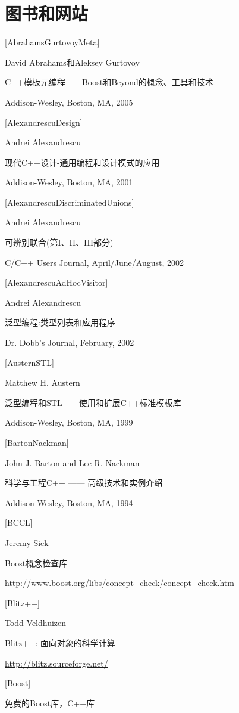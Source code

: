 \section*{图书和网站}

{[AbrahamsGurtovoyMeta]}

David Abrahams和Aleksey Gurtovoy

C++模板元编程——Boost和Beyond的概念、工具和技术
 
Addison-Wesley, Boston, MA, 2005

{[AlexandrescuDesign]}

Andrei Alexandrescu

现代C++设计-通用编程和设计模式的应用

Addison-Wesley, Boston, MA, 2001

{[AlexandrescuDiscriminatedUnions]}

Andrei Alexandrescu

可辨别联合(第I、II、III部分)

C/C++ Users Journal, April/June/August, 2002

{[AlexandrescuAdHocVisitor]}

Andrei Alexandrescu

泛型编程:类型列表和应用程序

Dr. Dobb’s Journal, February, 2002

{[AusternSTL]}

Matthew H. Austern

泛型编程和STL——使用和扩展C++标准模板库

Addison-Wesley, Boston, MA, 1999

{[BartonNackman]}

John J. Barton and Lee R. Nackman

科学与工程C++ —— 高级技术和实例介绍

Addison-Wesley, Boston, MA, 1994

{[BCCL]}

Jeremy Siek

Boost概念检查库

\url{http://www.boost.org/libs/concept_check/concept_check.htm}

{[Blitz++]}

Todd Veldhuizen

Blitz++: 面向对象的科学计算

\url{http://blitz.sourceforge.net/}

{[Boost]}

免费的Boost库，C++库

